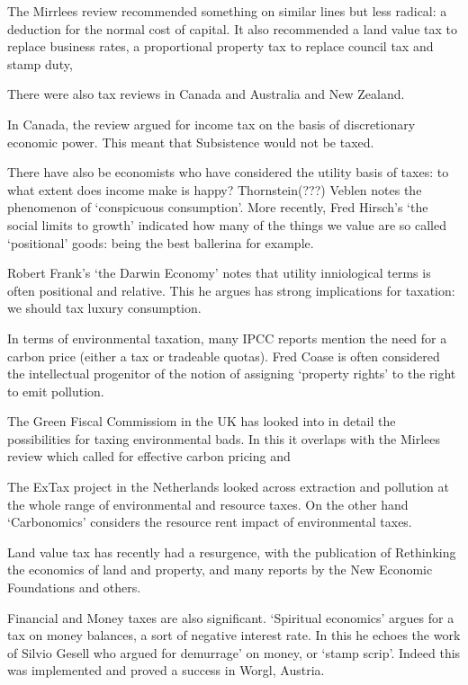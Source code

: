 \documentclass[]{tufte-handout}
\begin{document}
The Mirrlees review recommended something on similar lines but less
radical: a deduction for the normal cost of capital. It also recommended
a land value tax to replace business rates, a proportional property tax
to replace council tax and stamp duty,

There were also tax reviews in Canada and Australia and New Zealand.

In Canada, the review argued for income tax on the basis of
discretionary economic power. This meant that Subsistence would not be
taxed.

There have also be economists who have considered the utility basis of
taxes: to what extent does income make is happy? Thornstein(???) Veblen
notes the phenomenon of `conspicuous consumption'. More recently, Fred
Hirsch's `the social limits to growth' indicated how many of the things
we value are so called `positional' goods: being the best ballerina for
example.

Robert Frank's `the Darwin Economy' notes that utility inniological
terms is often positional and relative. This he argues has strong
implications for taxation: we should tax luxury consumption.

In terms of environmental taxation, many IPCC reports mention the need
for a carbon price (either a tax or tradeable quotas). Fred Coase is
often considered the intellectual progenitor of the notion of assigning
`property rights' to the right to emit pollution.

The Green Fiscal Commissiom in the UK has looked into in detail the
possibilities for taxing environmental bads. In this it overlaps with
the Mirlees review which called for effective carbon pricing and

The ExTax project in the Netherlands looked across extraction and
pollution at the whole range of environmental and resource taxes. On the
other hand `Carbonomics' considers the resource rent impact of
environmental taxes.

Land value tax has recently had a resurgence, with the publication of
Rethinking the economics of land and property, and many reports by the
New Economic Foundations and others.

Financial and Money taxes are also significant. `Spiritual economics'
argues for a tax on money balances, a sort of negative interest rate. In
this he echoes the work of Silvio Gesell who argued for demurrage' on
money, or `stamp scrip'. Indeed this was implemented and proved a
success in Worgl, Austria.
\end{document}

